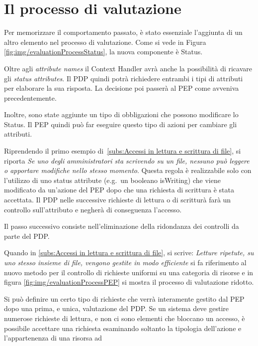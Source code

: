 \section{Il processo di valutazione}
\label{sec:Il processo di valutazione Facpl}
Per memorizzare il comportamento passato, è stato essenziale l'aggiunta di un altro elemento nel processo di valutazione.
Come si vede in Figura \ref{fig:img/evaluationProcessStatus}, la nuova componente è Status.\par
{}
Oltre agli \emph{attribute names} il Context Handler avrà anche la possibilità di ricavare gli \emph{status attributes}.
Il \ac{PDP} quindi potrà richiedere entrambi i tipi di attributi per elaborare la sua risposta. La decisione poi passerà al PEP
come avveniva precedentemente.\par
Inoltre, sono state aggiunte un tipo di obbligazioni che possono modificare lo Status. Il \ac{PEP} quindi può far eseguire questo tipo di
azioni per cambiare gli attributi.\par
Riprendendo il primo esempio di~\ref{subs:Accessi in lettura e scrittura di file}, si riporta \emph{Se uno degli amministratori
sta scrivendo su un file, nessuno può leggere o apportare modifiche nello stesso momento}. Questa regola è realizzabile
solo con l'utilizzo di uno status attribute (e.g.\ un booleano isWriting) che viene modificato da un'azione del PEP dopo che
una richiesta di scrittura è stata accettata. Il \ac{PDP} nelle successive richieste di lettura o di scritturà farà un controllo
sull'attributo e negherà di conseguenza l'accesso.\par
{}
Il passo successivo consiste nell'eliminazione della ridondanza dei controlli da parte del \ac{PDP}.\par
Quando in \ref{subs:Accessi in lettura e scrittura di file}, si scrive:
\emph{Letture ripetute, su uno stesso insieme di file, vengono gestite in modo efficiente}
si fa riferimento al nuovo metodo per il controllo di richieste uniformi su una categoria di risorse e
in figura \ref{fig:img/evaluationProcessPEP} si mostra il processo di valutazione ridotto.\par
Si può definire un certo tipo di richieste che verrà interamente gestito dal \ac{PEP} dopo una prima, e unica,
valutazione del \ac{PDP}. Se un sistema deve gestire numerose richieste di lettura, e non ci sono elementi che bloccano
un accesso, è possibile accettare una richiesta esaminando soltanto la tipologia dell'azione e l'appartenenza di una risorsa ad
